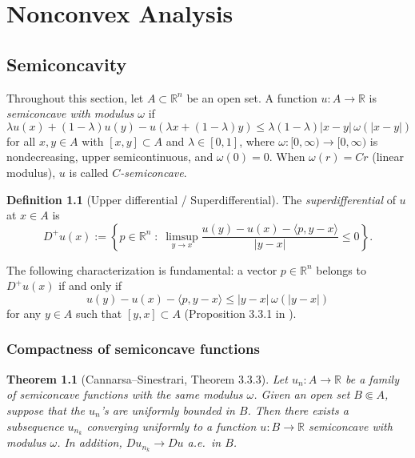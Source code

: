\documentclass[a4paper,11pt,fleqn, draft]{book}
\newtheorem{theorem}{Theorem}[section]
\theoremstyle{definition}
\newtheorem{definition}{Definition}[section]
\theoremstyle{remark}
\begin{document}
\chapter{Nonconvex Analysis}



\section{Semiconcavity}

Throughout this section, let $A \subset \mathbb{R}^n$ be an open set. A function $u : A \to \mathbb{R}$ is \emph{semiconcave with modulus $\omega$} if
\[
	\lambda u(x) + (1 - \lambda) u(y) - u(\lambda x + (1 - \lambda)y) \leqslant \lambda(1 - \lambda)|x - y|\,\omega(|x - y|)
\]
for all $x, y \in A$ with $[x,y] \subset A$ and $\lambda \in [0,1]$, where $\omega : [0, \infty) \to [0, \infty)$ is nondecreasing, upper semicontinuous, and $\omega(0) = 0$. When $\omega(r) = Cr$ (linear modulus), $u$ is called \emph{$C$-semiconcave}.

\begin{definition}[Upper differential / Superdifferential]
The \emph{superdifferential} of $u$ at $x \in A$ is
\[
	D^+ u(x) := \left\{ p \in \mathbb{R}^n \;:\; \limsup_{y \to x} \frac{u(y) - u(x) - \langle p, y - x \rangle}{|y - x|} \leqslant 0 \right\}.
\]
\end{definition}

The following characterization is fundamental: a vector $p \in \mathbb{R}^n$ belongs to $D^+ u(x)$ if and only if
\begin{equation}\label{eq:superdiff-prop331}
	u(y) - u(x) - \langle p, y - x \rangle \leqslant |y - x|\,\omega(|y - x|)
\end{equation}
for any $y \in A$ such that $[y, x] \subset A$ (Proposition 3.3.1 in \cite{cannarsa2004semiconcave}).

\subsection{Compactness of semiconcave functions}

\begin{theorem}[Cannarsa--Sinestrari, Theorem 3.3.3]\label{thm:sc-compactness}
Let $u_n : A \to \mathbb{R}$ be a family of semiconcave functions with the same modulus $\omega$. Given an open set $B \Subset A$, suppose that the $u_n$'s are uniformly bounded in $B$. Then there exists a subsequence $u_{n_k}$ converging uniformly to a function $u : B \to \mathbb{R}$ semiconcave with modulus $\omega$. In addition, $Du_{n_k} \to Du$ a.e.\ in $B$.
\end{theorem}
\end{document}
